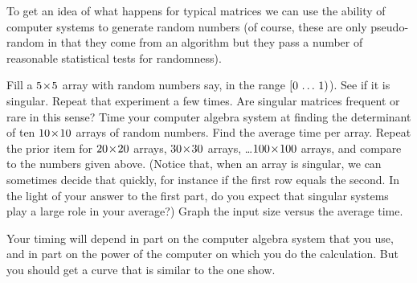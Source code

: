 \begin{exercises}
  \item 
    To get an idea of what happens for typical matrices
    we can use the ability of computer systems to generate random numbers
    (of course, these are only pseudo-random in that they come from
    an algorithm but they 
    pass a number of reasonable statistical tests for randomness).
    \begin{exparts}
      \partsitem Fill a $5 \! \times \! 5$ array with random numbers say, in the
        range $[0\,\ldots\, 1)$).
        See if it is singular.
        Repeat that experiment a few times.
        Are singular matrices frequent or rare in this sense?
      \partsitem Time your computer algebra system at finding the
        determinant of ten $10 \! \times \! 10$ arrays of random numbers.
        Find the average time per array.
        Repeat the prior item for $20 \! \times \! 20$ arrays,
        $30 \! \times \! 30$ arrays, \ldots $100 \! \times \! 100$ arrays, 
        and compare to the numbers given above.
        (Notice that, when an array is singular, we can sometimes decide that
        quickly,
        for instance if the first row equals the second.
        In the light of your answer to the first part, do you expect that 
        singular systems play a large role in your average?)
      \partsitem Graph the input size versus the average time.
    \end{exparts}
    \begin{answer}
      Your timing will depend in part on the computer algebra system
      that you use, and in part on the power of the computer on which
      you do the calculation.
      But you should get a curve that is similar to the one show.


\end{answer}
\end{exercises}
